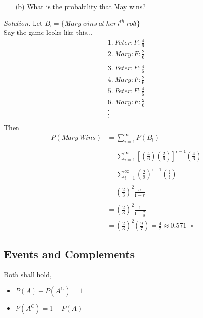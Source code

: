 \documentclass[12pt]{book}
\begin{document}
\begin{itemize}\item [(b)] What is the probability that May wins?\end{itemize}
\textit{Solution.}
Let $B_i=\{Mary~wins~at~her~i^{th}~roll\}$\\
Say the game looks like this...\\
$$\begin{aligned}
1.~Peter : F : \frac{4}{6}\\
2.~Mary : F : \frac{2}{6}\\
\end{aligned} $$
$$\begin{aligned}
3.~Peter : F : \frac{4}{6}\\
4.~Mary : F : \frac{2}{6}\\
5.~Peter : F : \frac{4}{6}\\
6.~Mary : F : \frac{2}{6}\\
.\\
.\\
.\\
\end{aligned} $$
Then 
$$
\begin{aligned}
P(Mary~Wins)&=\sum\limits_{i=1}^{\infty} P(B_{i})\\\\
&= \sum\limits_{i=1}^{\infty} \left[ \left(\frac{4}{6}\right) \left(\frac{2}{6}\right) \right]^{i-1} \left(\frac{4}{6}\right)\\\\
&=\sum\limits_{i=1}^{\infty} \left(\frac{2}{9}\right)^{i-1} \left(\frac{2}{3}\right)\\\\
&= \left(\frac{2}{3}\right)^{2} \frac{a}{1-r}\\\\
&=\left(\frac{2}{3}\right)^{2} \frac{1}{1-\frac{2}{9}}\\
&=\left(\frac{2}{3}\right)^{2} \left(\frac{9}{7}\right) = \frac{4}{7} \approx 0.571~~~\square
\end{aligned}
$$




\newpage
\subsection{Events and Complements}
Both shall hold, 
\begin{itemize}
\item $P(A)+P(A^C)=1$
\item $P(A^C)=1-P(A)$
\end{itemize}
\end{document}
